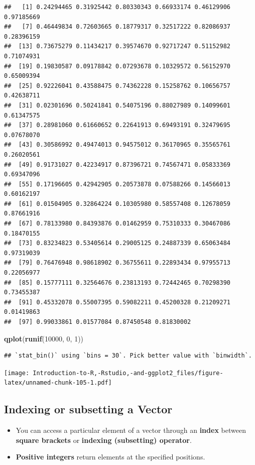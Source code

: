 \documentclass[]{book}
\newenvironment{Shaded}{\begin{snugshade}}{\end{snugshade}}
\newcommand{\DecValTok}[1]{\textcolor[rgb]{0.00,0.00,0.81}{#1}}
\newcommand{\KeywordTok}[1]{\textcolor[rgb]{0.13,0.29,0.53}{\textbf{#1}}}
\newcommand{\NormalTok}[1]{#1}
\begin{document}
\begin{verbatim}
##   [1] 0.24294465 0.31925442 0.80330343 0.66933174 0.46129906 0.97185669
##   [7] 0.46449834 0.72603665 0.18779317 0.32517222 0.82086937 0.28396159
##  [13] 0.73675279 0.11434217 0.39574670 0.92717247 0.51152982 0.71074931
##  [19] 0.19830587 0.09178842 0.07293678 0.10329572 0.56152970 0.65009394
##  [25] 0.92226041 0.43588475 0.74362228 0.15258762 0.10656757 0.42638711
##  [31] 0.02301696 0.50241841 0.54075196 0.88027989 0.14099601 0.61347575
##  [37] 0.28981060 0.61660652 0.22641913 0.69493191 0.32479695 0.07678070
##  [43] 0.30586992 0.49474013 0.94575012 0.36170965 0.35565761 0.26020561
##  [49] 0.91731027 0.42234917 0.87396721 0.74567471 0.05833369 0.69347096
##  [55] 0.17196605 0.42942905 0.20573878 0.07588266 0.14566013 0.60162197
##  [61] 0.01504905 0.32864224 0.10305980 0.58557408 0.12678059 0.87661916
##  [67] 0.78133980 0.84393876 0.01462959 0.75310333 0.30467086 0.18470155
##  [73] 0.83234823 0.53405614 0.29005125 0.24887339 0.65063484 0.97319039
##  [79] 0.76476948 0.98618902 0.36755611 0.22893434 0.97955713 0.22056977
##  [85] 0.15777111 0.32564676 0.23813193 0.72442465 0.70298390 0.73455387
##  [91] 0.45332078 0.55007395 0.59082211 0.45200328 0.21209271 0.01419863
##  [97] 0.99033861 0.01577084 0.87450548 0.81830002
\end{verbatim}

\begin{Shaded}
\begin{Highlighting}[]
\KeywordTok{qplot}\NormalTok{(}\KeywordTok{runif}\NormalTok{(}\DecValTok{10000}\NormalTok{, }\DecValTok{0}\NormalTok{, }\DecValTok{1}\NormalTok{))}
\end{Highlighting}
\end{Shaded}

\begin{verbatim}
## `stat_bin()` using `bins = 30`. Pick better value with `binwidth`.
\end{verbatim}

\texttt{[image: Introduction-to-R,-Rstudio,-and-ggplot2\_files/figure-latex/unnamed-chunk-105-1.pdf]}

\hypertarget{indexing-or-subsetting-a-vector}{%
\subsection{Indexing or subsetting a Vector}\label{indexing-or-subsetting-a-vector}}

\begin{itemize}
\item
  You can access a particular element of a vector through an \textbf{index} between \textbf{square brackets} or \textbf{indexing (subsetting) operator}.
\item
  \textbf{Positive integers} return elements at the specified positions.
\end{itemize}
\end{document}
